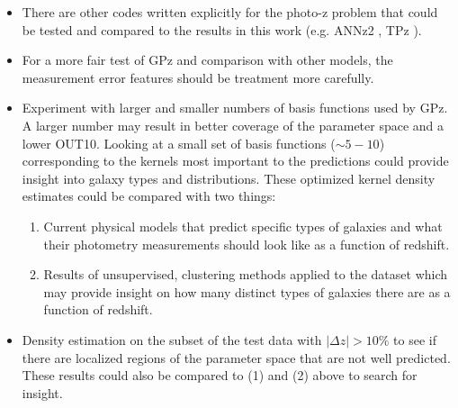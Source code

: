 \documentclass[13pt]{amsart}
\begin{document}
    \begin{itemize}
      \item  There are other codes written explicitly for the photo-z problem that could be tested and compared to the results in this work (e.g. ANNz2 \cite{annz2}, TPz \cite{tpz}).

      \item For a more fair test of GPz and comparison with other models, the measurement error features should be treatment more carefully.

      \item Experiment with larger and smaller numbers of basis functions used by GPz. A larger number may result in better coverage of the parameter space and a lower OUT10. Looking at a small set of basis functions ($\sim 5-10$) corresponding to the kernels most important to the predictions could provide insight into galaxy types and distributions. These optimized kernel density estimates could be compared with two things:
        \begin{enumerate}

          \item Current physical models that predict specific types of galaxies and what their photometry measurements should look like as a function of redshift.

          \item Results of unsupervised, clustering methods applied to the dataset which may provide insight on how many distinct types of galaxies there are as a function of redshift.
        \end{enumerate}

      \item Density estimation on the subset of the test data with $| \Delta z | > 10\%$ to see if there are localized regions of the parameter space that are not well predicted. These results could also be compared to (1) and (2) above to search for insight.

    \end{itemize}




\end{document}
